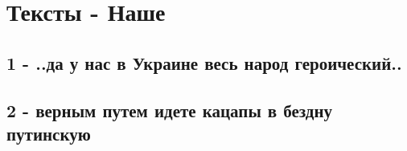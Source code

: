  
 
 
 
 
\section{Тексты - Наше}

\subsection{1 - ..да у нас в Украине весь народ героический..}

\subsection{2 - верным путем идете кацапы в бездну путинскую}

